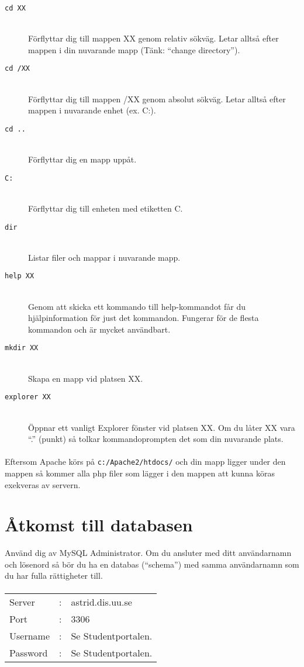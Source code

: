 \documentclass{article}
\begin{document}
    \begin{description}
      \item[\texttt{cd XX}] \hfill \\
      Förflyttar dig till mappen XX genom relativ sökväg. Letar alltså efter mappen i din nuvarande mapp (Tänk: ``change directory'').
      
      \item[\texttt{cd /XX}] \hfill \\
      Förflyttar dig till mappen /XX genom absolut sökväg. Letar alltså efter mappen i nuvarande enhet (ex. C:).

      \item[\texttt{cd ..}] \hfill \\
      Förflyttar dig en mapp uppåt.

      \item[\texttt{C:}] \hfill \\
      Förflyttar dig till enheten med etiketten C.

      \item[\texttt{dir}] \hfill \\
      Listar filer och mappar i nuvarande mapp.

      \item[\texttt{help XX}] \hfill \\
      Genom att skicka ett kommando till help-kommandot får du hjälpinformation för just det kommandon. Fungerar för de flesta kommandon och är mycket användbart.

      \item[\texttt{mkdir XX}] \hfill \\
      Skapa en mapp vid platsen XX.

      \item[\texttt{explorer XX}] \hfill \\
      Öppnar ett vanligt Explorer fönster vid platsen XX. Om du låter XX vara ``.'' (punkt) så tolkar kommandoprompten det som din nuvarande plats.
    \end{description}

  \paragraph{}
    Eftersom Apache körs på \texttt{c:/Apache2/htdocs/} och din mapp ligger under den mappen så kommer alla php filer som lägger i den mappen att kunna köras exekveras av servern.

  \section{Åtkomst till databasen}
  Använd dig av MySQL Administrator. Om du ansluter med ditt användarnamn och lösenord så bör du ha en databas (``schema'') med samma användarnamn som du har fulla rättigheter till.

  \paragraph{}
    \begin{tabular}{l c l}
    Server   & : & astrid.dis.uu.se \\
    Port     & : & 3306 \\
    Username & : & Se Studentportalen.\\
    Password & : & Se Studentportalen.\\
    \end{tabular}
\end{document}
